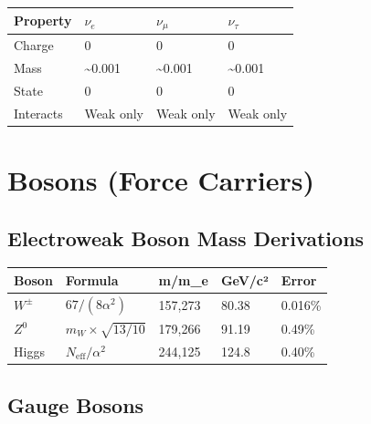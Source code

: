 \documentclass[
  11pt,
  letterpaper,
  twoside,
  openright]{book}
\begin{document}
\begin{longtable}[]{@{}llll@{}}
\toprule\noalign{}
Property & \(\nu_e\) & \(\nu_\mu\) & \(\nu_\tau\) \\
\midrule\noalign{}
\endhead
\bottomrule\noalign{}
\endlastfoot
Charge & 0 & 0 & 0 \\
Mass & \textasciitilde0.001 & \textasciitilde0.001 &
\textasciitilde0.001 \\
State & 0 & 0 & 0 \\
Interacts & Weak only & Weak only & Weak only \\
\end{longtable}

\section{Bosons (Force Carriers)}\label{bosons-force-carriers}

\subsection{Electroweak Boson Mass
Derivations}\label{electroweak-boson-mass-derivations}

\begin{longtable}[]{@{}lllll@{}}
\toprule\noalign{}
Boson & Formula & m/m\_e & GeV/c² & Error \\
\midrule\noalign{}
\endhead
\bottomrule\noalign{}
\endlastfoot
\(W^\pm\) & \(67/(8\alpha^2)\) & 157,273 & 80.38 & 0.016\% \\
\(Z^0\) & \(m_W \times \sqrt{13/10}\) & 179,266 & 91.19 & 0.49\% \\
Higgs & \(N_{\text{eff}}/\alpha^2\) & 244,125 & 124.8 & 0.40\% \\
\end{longtable}

\subsection{Gauge Bosons}\label{gauge-bosons}
\end{document}
